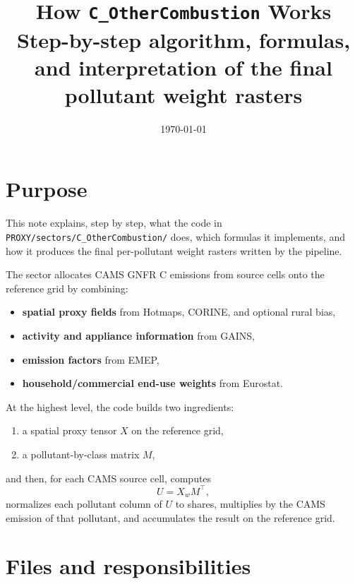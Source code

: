 \documentclass[11pt,a4paper]{article}
\title{How \texttt{C\_OtherCombustion} Works\\
\large Step-by-step algorithm, formulas, and interpretation of the final pollutant weight rasters}
\author{}
\date{\today}
\begin{document}
\maketitle

\section{Purpose}

This note explains, step by step, what the code in
\texttt{PROXY/sectors/C\_OtherCombustion/} does, which formulas it implements,
and how it produces the final per-pollutant weight rasters written by the
pipeline.

The sector allocates CAMS GNFR C emissions from source cells onto the reference
grid by combining:

\begin{itemize}[leftmargin=1.4em]
  \item \textbf{spatial proxy fields} from Hotmaps, CORINE, and optional rural bias,
  \item \textbf{activity and appliance information} from GAINS,
  \item \textbf{emission factors} from EMEP,
  \item \textbf{household/commercial end-use weights} from Eurostat.
\end{itemize}

At the highest level, the code builds two ingredients:

\begin{enumerate}[leftmargin=1.4em]
  \item a spatial proxy tensor $X$ on the reference grid,
  \item a pollutant-by-class matrix $M$,
\end{enumerate}

and then, for each CAMS source cell, computes
\[
U = X_w M^\top,
\]
normalizes each pollutant column of $U$ to shares, multiplies by the CAMS
emission of that pollutant, and accumulates the result on the reference grid.

\section{Files and responsibilities}
\end{document}
